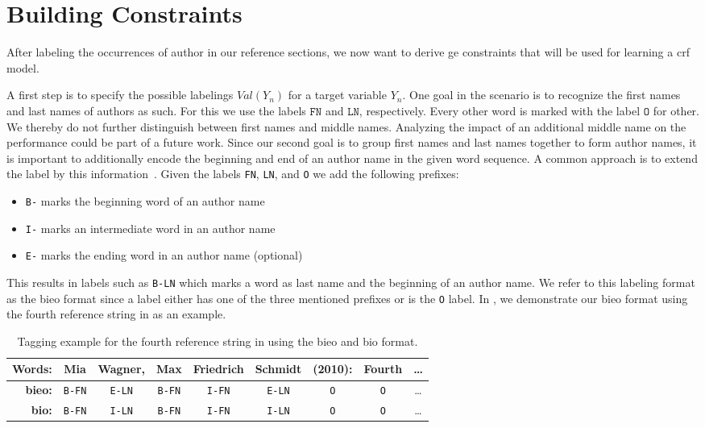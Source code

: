 \section{Building  Constraints}\label{sec:ae-training-crfs}

After labeling the occurrences of author in our reference sections, we now want to derive \gls{ge} constraints that will be used for learning a \gls{crf} model.

A first step is to specify the possible labelings $\mathit{Val}(Y_n)$ for a \gls{target variable} $Y_n$.
One goal in the scenario is to recognize the first names and last names of authors as such.
For this we use the labels $\texttt{FN}$ and $\texttt{LN}$, respectively.
Every other word is marked with the label $\texttt{O}$ for other.
We thereby do not further distinguish between first names and middle names.
Analyzing the impact of an additional middle name on the performance could be part of a future work.
Since our second goal is to group first names and last names together to form author names, it is important to additionally encode the beginning and end of an author name in the given word sequence.
A common approach is to extend the label by this information~\citep{ramshaw1995text,houngbo2012method}.
Given the labels \texttt{FN}, \texttt{LN}, and \texttt{O} we add the following prefixes:
\begin{itemize}
  \item \texttt{B-} marks the beginning word of an author name
  \item \texttt{I-} marks an intermediate word in an author name
  \item \texttt{E-} marks the ending word in an author name (optional)
\end{itemize}
This results in labels such as \texttt{B-LN} which marks a word as last name and the beginning of an author name.
We refer to this labeling format as the \gls{bieo} format since a label either has one of the three mentioned prefixes or is the \texttt{O} label.
In , we demonstrate our \gls{bieo} format using the fourth reference string in  as an example.
\begin{table}[t]
\centering
\begin{tabular}{r c c c c c c c c}
 \toprule
 \textbf{Words:} & Mia & Wagner, & Max & Friedrich & Schmidt & (2010): & Fourth & \dots\\
 \midrule
 \textbf{\acrshort{bieo}:} & \texttt{B-FN} & \texttt{E-LN} & \texttt{B-FN} & \texttt{I-FN} & \texttt{E-LN} & \texttt{O} & \texttt{O} & \dots\\
 \textbf{\acrshort{bio}:} & \texttt{B-FN} & \texttt{I-LN} & \texttt{B-FN} & \texttt{I-FN} & \texttt{I-LN} & \texttt{O} & \texttt{O} & \dots\\
 \bottomrule
\end{tabular}
\caption{Tagging example for the fourth reference string in  using the \acrshort{bieo} and \acrshort{bio} format.}
\label{tab:example-tagging}
\end{table}

